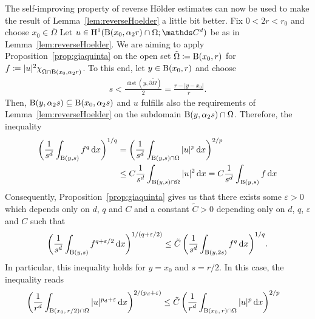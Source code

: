   \begin{rem}
    \label{rem:reverseHoelder}
    The self-improving property of reverse Hölder estimates can now be used to make the result of Lemma~\ref{lem:reverseHoelder} a little bit better. 
    Fix $0 < 2r < r_0$ and choose $x_0 \in \overline\Omega$
    Let $u \in \HH^1(\BB(x_0, \alpha_2 r) \cap \Omega; \C^d)$ be as in Lemma~\ref{lem:reverseHoelder}.
    We are aiming to apply Proposition~\ref{prop:giaquinta} on the open set $\tilde\Omega \coloneqq \mathrm{B}(x_0,r)$ for 
    $f \coloneqq |u|^2 \chi^{}_{\Omega \cap \mathrm{B}(x_0, \alpha_2 r)}$.
    To this end, let $y \in \mathrm{B}(x_0, r)$ and choose 
    \begin{align*}
      s < \frac{\operatorname{dist}(y, \partial\tilde\Omega)}{2} = \frac{r - |y - x_0|}{r}.
    \end{align*}
    Then, $\mathrm{B}(y, \alpha_2 s) \subseteq \mathrm{B}(x_0, \alpha_2 s)$ and $u$ fulfills also the requirements of Lemma~\ref{lem:reverseHoelder} on the subdomain $\mathrm{B}(y, \alpha_2 s) \cap \Omega$.
    Therefore, the inequality
    \begin{align*}
      \bigg( \frac{1}{s^d} \int_{\mathrm{B}(y, s)} f^q \, {\operatorname{d}\!{x}} \bigg)^{1/q} 
      &= \bigg( \frac{1}{s^d} \int_{\mathrm{B}(y, s) \cap \Omega} |u|^p \, {\operatorname{d}\!{x}} \bigg)^{2 / p} \\
      &\leq C \frac{1}{s^d} \int_{\mathrm{B}(y, s) \cap \Omega} |u|^2 \, {\operatorname{d}\!{x}}
      = C \frac{1}{s^d} \int_{\mathrm{B}(y, s)} f \, {\operatorname{d}\!{x}}
    \end{align*}
    Consequently, Proposition~\ref{prop:giaquinta} gives us that there exists some $\varepsilon > 0$ which depends only on $d$, $q$ and $C$ and a constant $\tilde C >0$ depending only on $d$, $q$, $\varepsilon$ and $C$ such that
    \begin{align*}
      \bigg( \frac{1}{s^d} \int_{\mathrm{B}(y, s)} f^{q + \varepsilon/2} \, {\operatorname{d}\!{x}} \bigg)^{1/(q + \varepsilon/2) }
      \leq \tilde C\, \bigg( \frac{1}{s^d} \int_{\mathrm{B}(y, 2 s)} f^q \, {\operatorname{d}\!{x}} \bigg)^{1/q}. 
    \end{align*}
    In particular, this inequality holds for $y = x_0$ and $s = r/2$.
    In this case, the inequality reads
    \begin{align*}
      \bigg( \frac{1}{r^d} \int_{\BB(x_0,\, r/2) \cap \Omega} |u|^{p_d + \varepsilon}\d x \bigg)^{2/(p_d + \varepsilon)} 
      &\leq \tilde C\, \bigg( \frac{1}{r^d} \int_{\BB(x_0,\, r) \cap \Omega} |u|^p \d x \bigg)^{2/p} %

\end{align*}
\end{rem}
